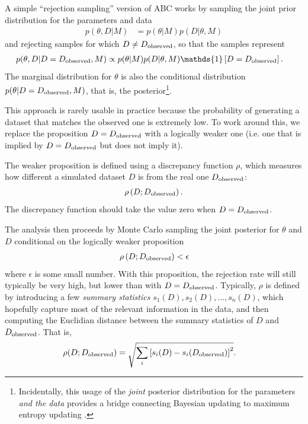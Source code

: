 \documentclass[article]{jss}
\begin{document}
A simple ``rejection sampling'' version of
ABC works by sampling the joint prior distribution for the parameters and
data
\begin{align}
p(\theta, D | M) &= p(\theta | M)p(D | \theta, M)
\end{align}
and rejecting samples for which $D \neq D_{\rm observed}$, so that the
samples represent
\begin{align}
p(\theta, D | D = D_{\rm observed}, M) &\propto p(\theta | M)p(D | \theta, M)
\mathds{1}\left[D = D_{\rm observed}\right].\label{eqn:abc_posterior}
\end{align}
The marginal distribution for $\theta$ is also the conditional distribution
$p(\theta | D = D_{\rm observed}, M)$, that is,
the posterior\footnote{Incidentally, this usage of the {\em joint} posterior
distribution for the parameters {\em and the data} provides a bridge
connecting Bayesian updating to maximum entropy updating \citep{caticha,giffin}.}.

This approach is rarely usable in practice because the probability of
generating a dataset that matches the observed one is extremely low.
To work around this, we replace the proposition
$D = D_{\rm observed}$ with a logically
weaker one (i.e. one that is implied by $D = D_{\rm observed}$ but does not
imply it).

The weaker proposition is defined using
a discrepancy function
$\rho$, which measures how different a simulated dataset $D$ is from
the real one $D_{\rm observed}$:
\begin{align}
\rho\left(D; D_{\rm observed}\right).
\end{align}
The discrepancy function should take the value zero when
$D = D_{\rm observed}$.

The analysis then proceeds by Monte Carlo sampling the
joint posterior for $\theta$ and $D$
conditional on the logically weaker proposition
\begin{align}
\rho\left(D; D_{\rm observed}\right) < \epsilon
\end{align}
where $\epsilon$ is some small number. With this proposition, the
rejection rate will still
typically be very high, but lower than with $D = D_{\rm observed}$.
Typically, $\rho$ is defined by introducing a few {\em summary statistics}
$s_1(D), s_2(D), ..., s_n(D)$, which hopefully capture most of the relevant
information in the data, and then computing the Euclidian distance
between the summary statistics of $D$ and $D_{\rm observed}$.
That is,
\begin{align}
\rho(D; D_{\rm observed}) &=
\sqrt{\sum_i \left[s_i(D) - s_i(D_{\rm observed})\right]^2}.
\end{align}
\end{document}
